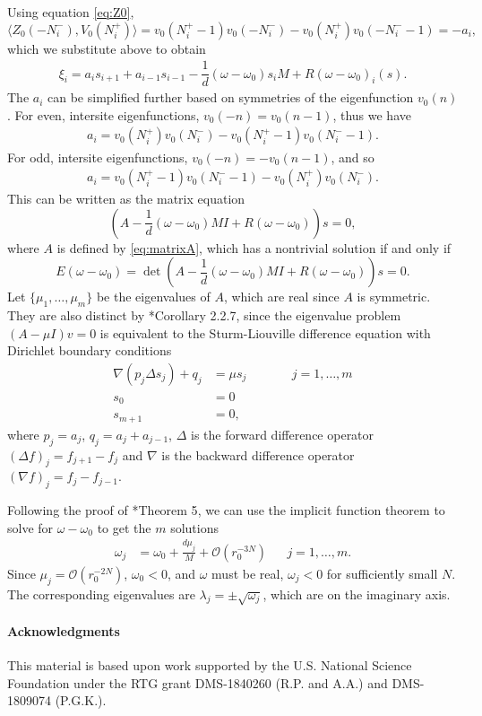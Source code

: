 \documentclass[12pt,reqno]{amsart}
\begin{document}
Using equation \cref{eq:Z0},
\[
\langle Z_0(-N_i^-), V_0(N_i^+) \rangle 
= v_0(N_i^+ - 1)v_0(-N_i^-) - v_0(N_i^+)v_0(-N_i^- - 1) = -a_i,
\]
which we substitute above to obtain
\begin{align}\label{eq:xifinal}
\xi_i = a_i s_{i+1}
+ a_{i-1} s_{i-1}
- \dfrac{1}{d} (\omega - \omega_0) s_i M 
+ R(\omega - \omega_0)_i(s).
\end{align}
The $a_i$ can be simplified further based on symmetries of the eigenfunction $v_0(n)$. For even, intersite eigenfunctions, $v_0(-n) = v_0(n-1)$, thus we have
\begin{align}\label{eq:aievenintersite}
a_i = v_0(N_i^+)v_0(N_i^-) - v_0(N_i^+ - 1)v_0(N_i^- -1).
\end{align}
For odd, intersite eigenfunctions, $v_0(-n) = -v_0(n-1)$, and so
\begin{align}\label{eq:aioddintersite}
	a_i = v_0(N_i^+ - 1)v_0(N_i^- -1) - v_0(N_i^+)v_0(N_i^-).
\end{align}
This can be written as the matrix equation
\begin{equation}\label{eq:matrixAeq}
	\left( A - \frac{1}{d}(\omega - \omega_0)MI + R(\omega-\omega_0)\right)s = 0,
\end{equation}
where $A$ is defined by \cref{eq:matrixA}, which has a nontrivial solution if and only if
\begin{equation}\label{eq:matrixdeteq}
	E(\omega - \omega_0) = 
	\det \left( A - \frac{1}{d}(\omega - \omega_0)MI + R(\omega-\omega_0)\right)s = 0.
\end{equation}
Let $\{ \mu_1, \dots, \mu_{m} \}$ be the eigenvalues of $A$, which are real since $A$ is symmetric. They are also distinct by \cite{Jirari1995}*{Corollary 2.2.7}, since the eigenvalue problem $(A - \mu I) v = 0$ is equivalent to the Sturm-Liouville difference equation with Dirichlet boundary conditions
\begin{equation*}
\begin{aligned}
\nabla( p_j \Delta s_j ) + q_j &= \mu s_j && \qquad j = 1, \dots, m \\
s_0 &= 0 \\
s_{m+1} &= 0,
\end{aligned}
\end{equation*}
where $p_j = a_j$, $q_j = a_j + a_{j-1}$, $\Delta$ is the forward difference operator $(\Delta f)_j = f_{j+1} - f_j$ and $\nabla$ is the backward difference operator $(\nabla f)_j = f_j - f_{j-1}$. 

Following the proof of \cite{Parker2020}*{Theorem 5}, we can use the implicit function theorem to solve for $\omega - \omega_0$ to get the $m$ solutions
\begin{align*}
	\omega_j &= \omega_0 + \frac{d \mu_j}{M} + \mathcal{O}(r_0^{-3N}) && j = 1, \dots, m.
\end{align*}
Since $\mu_j = \mathcal{O}(r_0^{-2N})$, $\omega_0 < 0$, and $\omega$ must be real, $\omega_j < 0$ for sufficiently small $N$. The corresponding eigenvalues are $\lambda_j = \pm \sqrt{\omega_j}$, which are on the imaginary axis.\\

\paragraph{Acknowledgments}

This material is based upon work supported by the U.S. National Science Foundation under the RTG grant DMS-1840260 (R.P. and A.A.)
and DMS-1809074 (P.G.K.).



\end{document}
